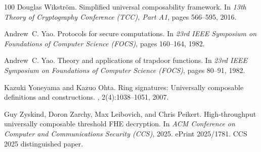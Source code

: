 \documentclass[11pt,a4paper]{article}
\begin{document}
\begin{thebibliography}{100}
Douglas Wikstr{\"o}m.
\newblock Simplified universal composability framework.
\newblock In {\em 13th Theory of Cryptography Conference (TCC), Part A1}, pages
  566--595, 2016.

Andrew~C. Yao.
\newblock Protocols for secure computations.
\newblock In {\em 23rd IEEE Symposium on Foundations of Computer Science
  (FOCS)}, pages 160--164, 1982.

Andrew~C. Yao.
\newblock Theory and applications of trapdoor functions.
\newblock In {\em 23rd IEEE Symposium on Foundations of Computer Science
  (FOCS)}, pages 80--91, 1982.

Kazuki Yoneyama and Kazuo Ohta.
\newblock Ring signatures: Universally composable definitions and
  constructions.
, 2(4):1038--1051, 2007.

Guy Zyskind, Doron Zarchy, Max Leibovich, and Chris Peikert.
\newblock High-throughput universally composable threshold {FHE} decryption.
\newblock In {\em ACM Conference on Computer and Communications Security
  (CCS)}, 2025.
\newblock ePrint 2025/1781. CCS 2025 distinguished paper.

\end{thebibliography}
\end{document}
